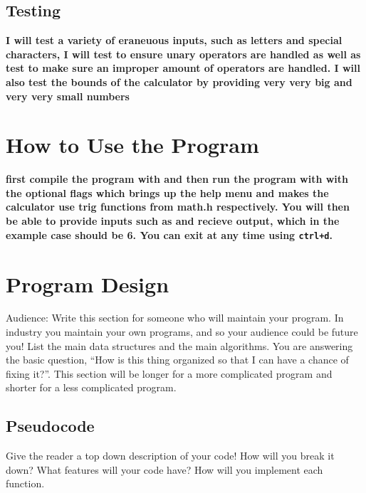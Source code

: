 \documentclass{article}
\begin{document}
\subsection*{Testing}

\textbf{I will test a variety of eraneuous inputs, such as letters and special characters, I will test to ensure unary operators are handled as well as test to make sure an improper amount of operators are handled. I will also test the bounds of the calculator by providing very very big and very very small numbers}

\section*{How to Use the Program}

\textbf{first compile the program with  and then run the program with  with the optional flags  which brings up the help menu and makes the calculator use trig functions from math.h respectively. You will then be able to provide inputs such as  and recieve output, which in the example case should be 6. You can exit at any time using \lstinline{ctrl+d}.}

\section*{Program Design}

Audience: Write this section for someone
who will maintain your program.
In industry you maintain your own
programs, and so your audience could be
future you! List
the main data structures and the main
algorithms. You are answering the basic
question, ``How is this thing organized
so that I can have a chance of fixing
it?''. This section will be longer for a
more complicated program and shorter for
a less complicated program.

\subsection*{Pseudocode}
Give the reader a top down description of your code! How will you break it down? What features will your code have? 
How will you implement each function. 
\end{document}
